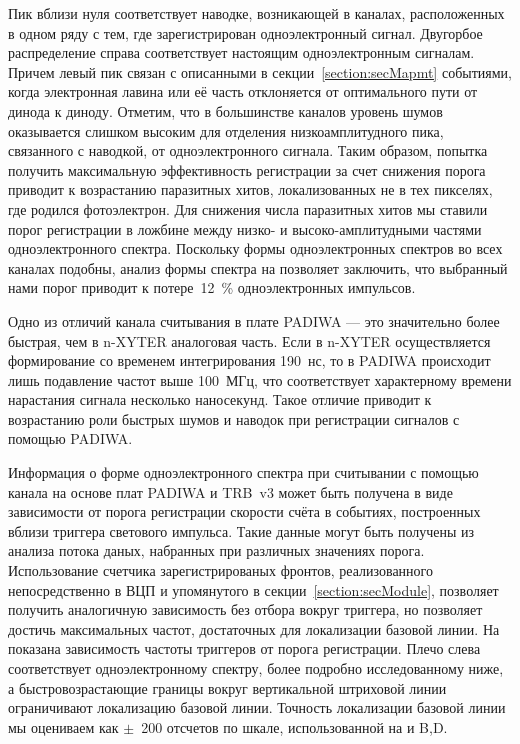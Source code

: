 Пик вблизи нуля соответствует наводке, возникающей в каналах, расположенных в одном ряду с тем, где зарегистрирован одноэлектронный сигнал. Двугорбое распределение справа соответствует настоящим одноэлектронным сигналам. Причем левый пик связан с описанными в секции~\ref{section:secMapmt} событиями, когда электронная лавина или её часть отклоняется от оптимального пути от динода к диноду. Отметим, что в большинстве каналов уровень шумов оказывается слишком высоким для отделения низкоамплитудного пика, связанного с наводкой, от одноэлектронного сигнала. Таким образом, попытка получить максимальную эффективность регистрации за счет снижения порога приводит к возрастанию паразитных хитов, локализованных не в тех пикселях, где родился фотоэлектрон. Для снижения числа паразитных хитов мы ставили порог регистрации в ложбине между низко- и высоко-амплитудными частями одноэлектронного спектра. Поскольку формы одноэлектронных спектров во всех каналах подобны, анализ формы спектра на  позволяет заключить, что выбранный нами порог приводит к потере~12~\% одноэлектронных импульсов.

Одно из отличий канала считывания в плате PADIWA --- это значительно более быстрая, чем в n-XYTER аналоговая часть. Если в n-XYTER осуществляется формирование со временем интегрирования 190~нс, то в PADIWA происходит лишь подавление частот выше 100~МГц, что соответствует характерному времени нарастания сигнала несколько наносекунд. Такое отличие приводит к возрастанию роли быстрых шумов и наводок при регистрации сигналов с помощью PADIWA.

Информация о форме одноэлектронного спектра при считывании с помощью канала на основе плат PADIWA и TRB~v3 может быть получена в виде зависимости от порога регистрации скорости счёта в событиях, построенных вблизи триггера светового импульса. Такие данные могут быть получены из анализа потока даных, набранных при различных значениях порога. Использование счетчика зарегистрированых фронтов, реализованного непосредственно в ВЦП и упомянутого в секции~\ref{section:secModule}, позволяет получить аналогичную зависимость без отбора вокруг триггера, но позволяет достичь максимальных частот, достаточных для локализации базовой линии. На  показана зависимость частоты триггеров от порога регистрации. Плечо слева соответствует одноэлектронному спектру, более подробно исследованному ниже, а быстровозрастающие границы вокруг вертикальной штриховой линии ограничивают локализацию базовой линии. Точность локализации базовой линии мы оцениваем как $ \pm $~200 отсчетов по шкале, использованной на  и B,D.

